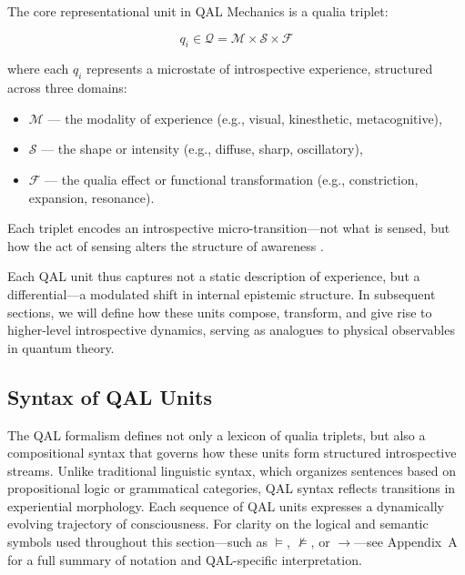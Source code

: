 \documentclass[11pt]{article}
\numberwithin{equation}{section} %
\begin{document}
The core representational unit in QAL Mechanics is a qualia triplet:

\begin{equation}
q_i \in \mathcal{Q} = \mathcal{M} \times \mathcal{S} \times \mathcal{F}
\end{equation}

\noindent where each \( q_i \) represents a microstate of introspective experience, structured across three domains:
\begin{itemize}
  \item \( \mathcal{M} \) — the modality of experience (e.g., visual, kinesthetic, metacognitive),
  \item \( \mathcal{S} \) — the shape or intensity (e.g., diffuse, sharp, oscillatory),
  \item \( \mathcal{F} \) — the qualia effect or functional transformation (e.g., constriction, expansion, resonance).
\end{itemize}

Each triplet encodes an introspective micro-transition—not what is sensed, but how the act of sensing alters the structure of awareness \cite{chalmers1996, varela1996, rosch1992}.


Each QAL unit thus captures not a static description of experience, but a differential—a modulated shift in internal epistemic structure. In subsequent sections, we will define how these units compose, transform, and give rise to higher-level introspective dynamics, serving as analogues to physical observables in quantum theory.

\subsection{Syntax of QAL Units}

The QAL formalism defines not only a lexicon of qualia triplets, but also a compositional syntax that governs how these units form structured introspective streams. Unlike traditional linguistic syntax, which organizes sentences based on propositional logic or grammatical categories, QAL syntax reflects transitions in experiential morphology. Each sequence of QAL units expresses a dynamically evolving trajectory of consciousness. For clarity on the logical and semantic symbols used throughout this section—such as \( \models \), \( \not\models \), or \( \rightarrow \)—see Appendix~A for a full summary of notation and QAL-specific interpretation.
\end{document}
